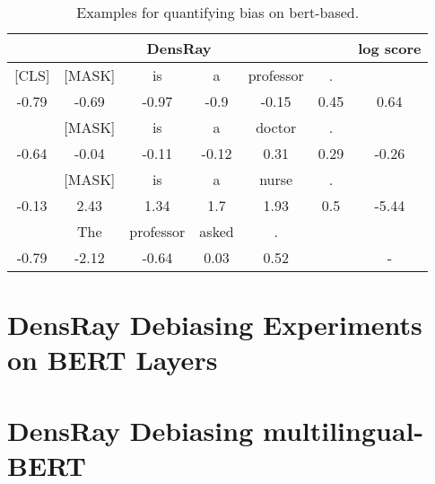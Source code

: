 \documentclass[11pt,a4paper]{article}
\def\tablabel#1{\label{tab:#1}\label{p:#1}}
\begin{document}
\begin{table}[ht]
	\centering
	\scriptsize
	\begin{tabular}{ccccccc}
		\hline
\multicolumn{6}{c|}{DensRay}&log score\\		
\hline
[CLS] &[MASK] &is &a& professor &.&\\
-0.79 &-0.69 &-0.97 &-0.9  &-0.15  &0.45&0.64\\
\hline
[CLS] &[MASK] &is &a& doctor &.&\\
-0.64 &-0.04 &-0.11 &-0.12  &0.31  &0.29 &-0.26\\
\hline
[CLS] &[MASK] &is &a& nurse &.&\\
-0.13  &2.43  &1.34  &1.7   &1.93  &0.5 &-5.44\\
\hline
[CLS] &The &professor &asked &.&&\\
-0.79 &-2.12 &-0.64 & 0.03&  0.52&&-\\

		\hline
	\end{tabular}
	\caption{\tablabel{t:measure1}
		Examples for quantifying bias on bert-based.}
\end{table}

\section{DensRay Debiasing Experiments on BERT Layers}


\section{DensRay Debiasing multilingual-BERT}

\end{document}
